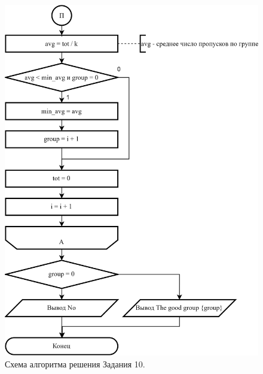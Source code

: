 \documentclass[oneside,a4paper,14pt]{extarticle}
\begin{document}
\begin{figure}
	\centering
	\includegraphics[height=0.85\textheight]{img/10-scheme-p2.png} %
	\caption{Схема алгоритма решения Задания 10.} %
\end{figure}
\end{document}
